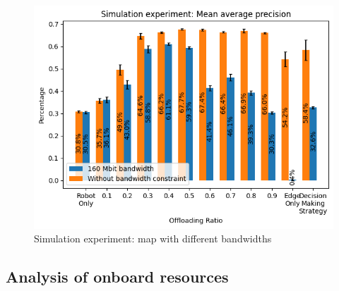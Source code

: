 \begin{figure}[htp]
    \centering
    \includegraphics[width=\linewidth]{figures/experiment/simulation/map.png}
    \caption{Simulation experiment: \gls{map} with different bandwidths}
    \label{fig:simulation:map}
\end{figure}


\subsection{Analysis of onboard resources}


